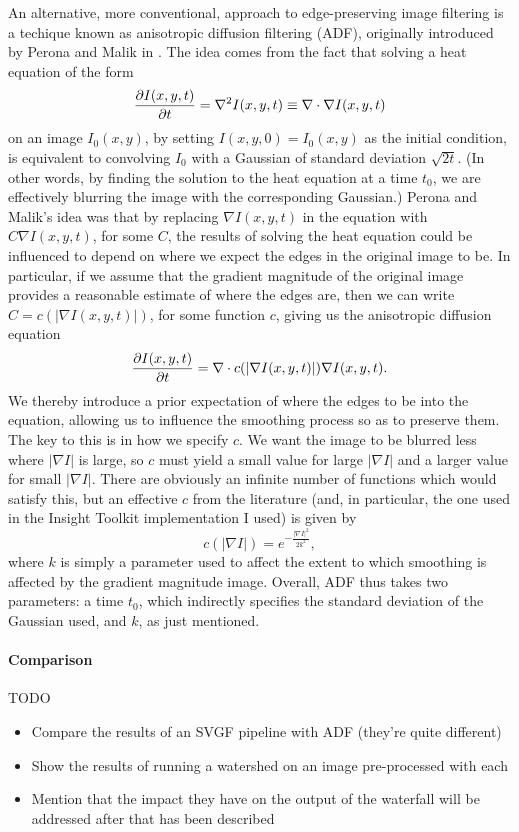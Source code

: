 An alternative, more conventional, approach to edge-preserving image filtering is a techique known as anisotropic diffusion filtering (ADF), originally introduced by Perona and Malik in \cite{perona90}. The idea comes from the fact that solving a heat equation of the form
%
\[
\frac{\partial I(x,y,t)}{\partial t} = \nabla^2 I(x,y,t) \equiv \nabla \cdot \nabla I(x,y,t)
\]
%
on an image $I_0(x,y)$, by setting $I(x,y,0) = I_0(x,y)$ as the initial condition, is equivalent to convolving $I_0$ with a Gaussian of standard deviation $\sqrt{2t}$. (In other words, by finding the solution to the heat equation at a time $t_0$, we are effectively blurring the image with the corresponding Gaussian.) Perona and Malik's idea was that by replacing $\nabla I(x,y,t)$ in the equation with $C \nabla I(x,y,t)$, for some $C$, the results of solving the heat equation could be influenced to depend on where we expect the edges in the original image to be. In particular, if we assume that the gradient magnitude of the original image provides a reasonable estimate of where the edges are, then we can write $C = c(|\nabla I(x,y,t)|)$, for some function $c$, giving us the anisotropic diffusion equation
%
\[
\frac{\partial I(x,y,t)}{\partial t} = \nabla \cdot c(|\nabla I(x,y,t)|) \nabla I(x,y,t).
\]
%
We thereby introduce a prior expectation of where the edges to be into the equation, allowing us to influence the smoothing process so as to preserve them. The key to this is in how we specify $c$. We want the image to be blurred less where $|\nabla I|$ is large, so $c$ must yield a small value for large $|\nabla I|$ and a larger value for small $|\nabla I|$. There are obviously an infinite number of functions which would satisfy this, but an effective $c$ from the literature (and, in particular, the one used in the Insight Toolkit \cite{ITK} implementation I used) is given by
%
\[
c(|\nabla I|) = e^{-\frac{|\nabla I|^2}{2k^2}},
\]
%
where $k$ is simply a parameter used to affect the extent to which smoothing is affected by the gradient magnitude image. Overall, ADF thus takes two parameters: a time $t_0$, which indirectly specifies the standard deviation of the Gaussian used, and $k$, as just mentioned.

\paragraph{Comparison}

TODO

\begin{itemize}
\item Compare the results of an SVGF pipeline with ADF (they're quite different)
\item Show the results of running a watershed on an image pre-processed with each
\item Mention that the impact they have on the output of the waterfall will be addressed after that has been described
\end{itemize}

